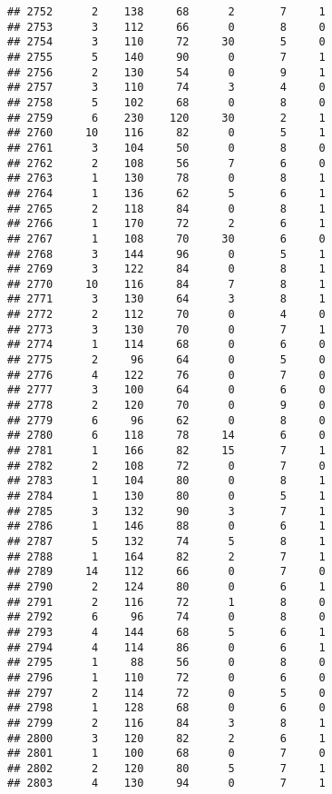 \documentclass[
]{article}
\begin{document}
\begin{verbatim}
## 2752      2    138     68      2       7     1
## 2753      3    112     66      0       8     0
## 2754      3    110     72     30       5     0
## 2755      5    140     90      0       7     1
## 2756      2    130     54      0       9     1
## 2757      3    110     74      3       4     0
## 2758      5    102     68      0       8     0
## 2759      6    230    120     30       2     1
## 2760     10    116     82      0       5     1
## 2761      3    104     50      0       8     0
## 2762      2    108     56      7       6     0
## 2763      1    130     78      0       8     1
## 2764      1    136     62      5       6     1
## 2765      2    118     84      0       8     1
## 2766      1    170     72      2       6     1
## 2767      1    108     70     30       6     0
## 2768      3    144     96      0       5     1
## 2769      3    122     84      0       8     1
## 2770     10    116     84      7       8     1
## 2771      3    130     64      3       8     1
## 2772      2    112     70      0       4     0
## 2773      3    130     70      0       7     1
## 2774      1    114     68      0       6     0
## 2775      2     96     64      0       5     0
## 2776      4    122     76      0       7     0
## 2777      3    100     64      0       6     0
## 2778      2    120     70      0       9     0
## 2779      6     96     62      0       8     0
## 2780      6    118     78     14       6     0
## 2781      1    166     82     15       7     1
## 2782      2    108     72      0       7     0
## 2783      1    104     80      0       8     1
## 2784      1    130     80      0       5     1
## 2785      3    132     90      3       7     1
## 2786      1    146     88      0       6     1
## 2787      5    132     74      5       8     1
## 2788      1    164     82      2       7     1
## 2789     14    112     66      0       7     0
## 2790      2    124     80      0       6     1
## 2791      2    116     72      1       8     0
## 2792      6     96     74      0       8     0
## 2793      4    144     68      5       6     1
## 2794      4    114     86      0       6     1
## 2795      1     88     56      0       8     0
## 2796      1    110     72      0       6     0
## 2797      2    114     72      0       5     0
## 2798      1    128     68      0       6     0
## 2799      2    116     84      3       8     1
## 2800      3    120     82      2       6     1
## 2801      1    100     68      0       7     0
## 2802      2    120     80      5       7     1
## 2803      4    130     94      0       7     1

\end{verbatim}
\end{document}
